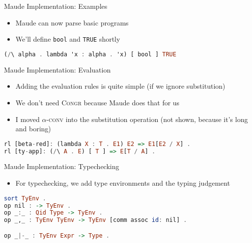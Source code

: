 \documentclass[leqno,presentation,usenames,dvipsnames]{beamer}
\begin{document}
\begin{frame}[fragile]{Maude Implementation: Examples}
    \begin{itemize}
        \item Maude can now parse basic programs
        \item We'll define \texttt{bool} and \texttt{TRUE} shortly
    \end{itemize}

\begin{lstlisting}[language=haskell, basicstyle=\small\ttfamily]
(/\ alpha . lambda 'x : alpha . 'x) [ bool ] TRUE
\end{lstlisting}
\end{frame}

\begin{frame}[fragile]{Maude Implementation: Evaluation}
    \begin{itemize}
        \item Adding the evaluation rules is quite simple (if we ignore substitution)
        \item We don't need \textsc{Congr} because Maude does that for us
        \item I moved \textsc{$\alpha$-conv} into the substitution operation (not shown, because it's long and boring)
    \end{itemize}

\begin{lstlisting}[language=haskell, basicstyle=\small\ttfamily]
rl [beta-red]: (lambda X : T . E1) E2 => E1[E2 / X] .
rl [ty-app]: (/\ A . E) [ T ] => E[T / A] .
\end{lstlisting}
\end{frame}

\begin{frame}[fragile]{Maude Implementation: Typechecking}
    \begin{itemize}
        \item For typechecking, we add type environments and the typing judgement
    \end{itemize}

\begin{lstlisting}[language=haskell, basicstyle=\small\ttfamily]
sort TyEnv .
op nil : -> TyEnv .
op _:_ : Qid Type -> TyEnv .
op _,_ : TyEnv TyEnv -> TyEnv [comm assoc id: nil] .

op _|-_ : TyEnv Expr -> Type .
\end{lstlisting}
\end{frame}
\end{document}
